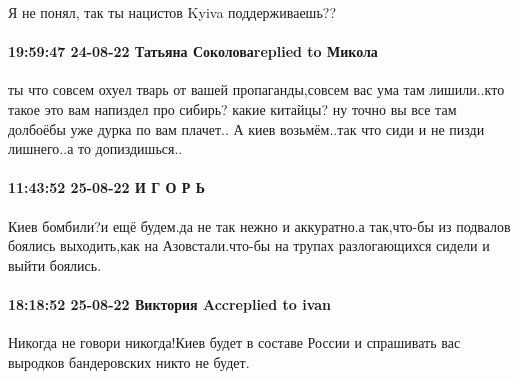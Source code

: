 Я не понял, так ты нацистов Kyiva поддерживаешь??

\paragraph{19:59:47 24-08-22 Татьяна Соколоваreplied to Микола}



ты что совсем охуел тварь от вашей пропаганды,совсем вас ума там лишили..кто
такое это вам напиздел про сибирь? какие китайцы? ну точно вы все там долбоёбы
уже дурка по вам плачет.. А киев возьмём..так что сиди и не пизди лишнего..а то
допиздишься..

\paragraph{11:43:52 25-08-22 И Г О Р Ь}

Киев бомбили?и ещё будем.да не так нежно и аккуратно.а так,что-бы из подвалов
боялись выходить,как на Азовстали.что-бы на трупах разлогающихся сидели и выйти
боялись.

\paragraph{18:18:52 25-08-22 Виктория Accreplied to ivan}

Никогда не говори никогда!Киев будет в составе России и спрашивать вас выродков
бандеровских никто не будет.
